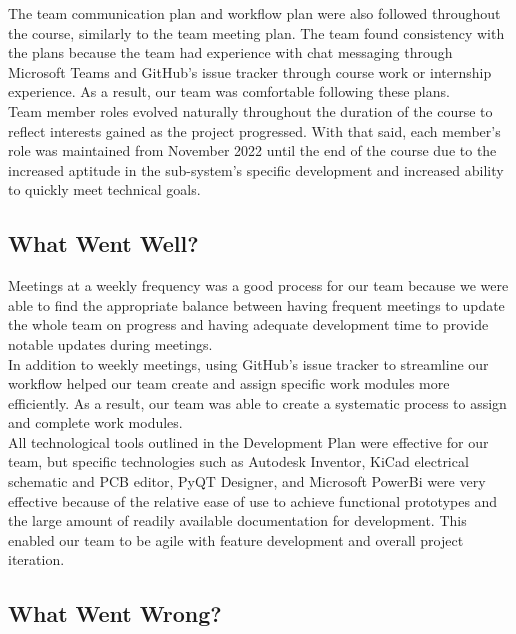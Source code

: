 \documentclass[12pt]{article}
\begin{document}
The team communication plan and workflow plan were also followed throughout the course, similarly to the team meeting plan. The team found consistency with the plans because the team had experience with chat messaging through Microsoft Teams and GitHub's issue tracker through course work or internship experience. As a result, our team was comfortable following these plans. \\

Team member roles evolved naturally throughout the duration of the course to reflect interests gained as the project progressed. With that said, each member's role was maintained from November 2022 until the end of the course due to the increased aptitude in the sub-system's specific development and increased ability to quickly meet technical goals. \\



\subsection{What Went Well?}


Meetings at a weekly frequency was a good process for our team because we were able to find the appropriate balance between having frequent meetings to update the whole team on progress and having adequate development time to provide notable updates during meetings. \\

In addition to weekly meetings, using GitHub's issue tracker to streamline our workflow helped our team create and assign specific work modules more efficiently. As a result, our team was able to create a systematic process to assign and complete work modules. \\

All technological tools outlined in the Development Plan were effective for our team, but specific technologies such as Autodesk Inventor, KiCad electrical schematic and PCB editor, PyQT Designer, and Microsoft PowerBi were very effective because of the relative ease of use to achieve functional prototypes and the large amount of readily available documentation for development. This enabled our team to be agile with feature development and overall project iteration. 

\subsection{What Went Wrong?}
\end{document}
